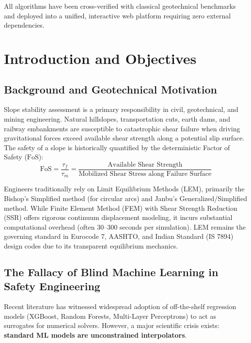 \documentclass[12pt,a4paper,oneside]{report}
\begin{document}
All algorithms have been cross-verified with classical geotechnical benchmarks and deployed into a unified, interactive web platform requiring zero external dependencies.

\newpage

\tableofcontents
\listoffigures
\listoftables
\newpage

\chapter{Introduction and Objectives}

\section{Background and Geotechnical Motivation}
Slope stability assessment is a primary responsibility in civil, geotechnical, and mining engineering. Natural hillslopes, transportation cuts, earth dams, and railway embankments are susceptible to catastrophic shear failure when driving gravitational forces exceed available shear strength along a potential slip surface. The safety of a slope is historically quantified by the deterministic Factor of Safety ($\text{FoS}$):
\begin{equation}
  \text{FoS} = \frac{\tau_f}{\tau_m} = \frac{\text{Available Shear Strength}}{\text{Mobilized Shear Stress along Failure Surface}}
\end{equation}

Engineers traditionally rely on Limit Equilibrium Methods (LEM), primarily the Bishop's Simplified method (for circular arcs) and Janbu's Generalized/Simplified method. While Finite Element Method (FEM) with Shear Strength Reduction (SSR) offers rigorous continuum displacement modeling, it incurs substantial computational overhead (often 30--300 seconds per simulation). LEM remains the governing standard in Eurocode 7, AASHTO, and Indian Standard (IS 7894) design codes due to its transparent equilibrium mechanics.

\section{The Fallacy of Blind Machine Learning in Safety Engineering}
Recent literature has witnessed widespread adoption of off-the-shelf regression models (XGBoost, Random Forests, Multi-Layer Perceptrons) to act as surrogates for numerical solvers. However, a major scientific crisis exists: \textbf{standard ML models are unconstrained interpolators}. 
\end{document}
